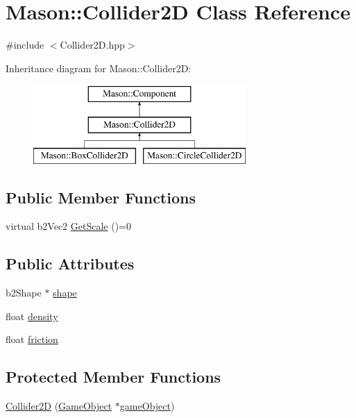 \hypertarget{class_mason_1_1_collider2_d}{}\section{Mason\+:\+:Collider2D Class Reference}
\label{class_mason_1_1_collider2_d}


{\ttfamily \#include $<$Collider2\+D.\+hpp$>$}

Inheritance diagram for Mason\+:\+:Collider2D\+:\begin{figure}[H]
\begin{center}
\leavevmode
\includegraphics[height=3.000000cm]{class_mason_1_1_collider2_d}
\end{center}
\end{figure}
\subsection*{Public Member Functions}
\begin{DoxyCompactItemize}
\item 
virtual b2\+Vec2 \hyperlink{class_mason_1_1_collider2_d_a3394739f1fea805691ac2753a9272156}{Get\+Scale} ()=0
\end{DoxyCompactItemize}
\subsection*{Public Attributes}
\begin{DoxyCompactItemize}
\item 
b2\+Shape $\ast$ \hyperlink{class_mason_1_1_collider2_d_a82de033fe10f7da3fd079c7ff54eaf94}{shape}
\item 
float \hyperlink{class_mason_1_1_collider2_d_ad3b9178c829dbe0a8a25a75d643f8744}{density}
\item 
float \hyperlink{class_mason_1_1_collider2_d_ab08954cffa1ac7539e26c4e2da535481}{friction}
\end{DoxyCompactItemize}
\subsection*{Protected Member Functions}
\begin{DoxyCompactItemize}
\item 
\hyperlink{class_mason_1_1_collider2_d_a7ac26a9d09d5380b49027e9ae50fdacc}{Collider2D} (\hyperlink{class_mason_1_1_game_object}{Game\+Object} $\ast$\hyperlink{class_mason_1_1_component_a30030370c35f5562cbbbb0927b0448c8}{game\+Object})
\end{DoxyCompactItemize}
